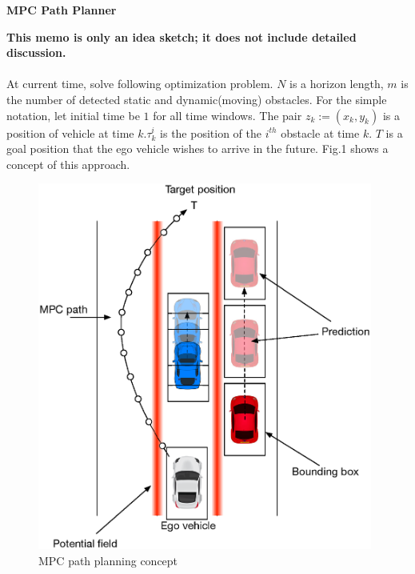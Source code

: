 \documentclass[12pt]{article}
\begin{document}

\noindent
\begin{center}
 \textbf{MPC Path Planner}
\vspace{0.5cm}
\noindent
\vspace{0.5cm}
\end{center}
\textbf{This memo is only an idea sketch; it does not include detailed discussion.}
\\
\\ 
At current time, solve following optimization problem. $N$ is a horizon length, $m$ is the number of detected static and dynamic(moving) obstacles. For the simple notation, let initial time be $1$ for all time windows. The pair $z_k:=(x_k,y_k)$ is a position of vehicle at time $k$.$\tau^i_k$ is the position of the $i^{th}$ obstacle at time $k$. $T$ is a goal position that the ego vehicle wishes to arrive in the future. Fig.1 shows a concept of this approach.

\begin{figure}[h!]
\begin{centering}
	\includegraphics[width=11cm]{./Figures/mpc-path.eps}
\par\end{centering}
\caption{MPC path planning concept }
\end{figure}
\end{document}
